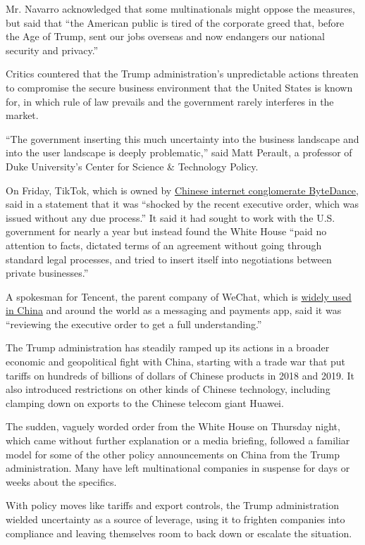 Mr. Navarro acknowledged that some multinationals might oppose the
measures, but said that ``the American public is tired of the corporate
greed that, before the Age of Trump, sent our jobs overseas and now
endangers our national security and privacy.''

Critics countered that the Trump administration's unpredictable actions
threaten to compromise the secure business environment that the United
States is known for, in which rule of law prevails and the government
rarely interferes in the market.

``The government inserting this much uncertainty into the business
landscape and into the user landscape is deeply problematic,'' said Matt
Perault, a professor of Duke University's Center for Science \&
Technology Policy.

On Friday, TikTok, which is owned by
\href{https://www.nytimes.com/2018/10/29/technology/bytedance-app-funding-china.html}{Chinese
internet conglomerate ByteDance}, said in a statement that it was
``shocked by the recent executive order, which was issued without any
due process.'' It said it had sought to work with the U.S. government
for nearly a year but instead found the White House ``paid no attention
to facts, dictated terms of an agreement without going through standard
legal processes, and tried to insert itself into negotiations between
private businesses.''

A spokesman for Tencent, the parent company of WeChat, which is
\href{https://www.nytimes.com/video/technology/100000004574648/china-internet-wechat.html}{widely
used in China} and around the world as a messaging and payments app,
said it was ``reviewing the executive order to get a full
understanding.''

The Trump administration has steadily ramped up its actions in a broader
economic and geopolitical fight with China, starting with a trade war
that put tariffs on hundreds of billions of dollars of Chinese products
in 2018 and 2019. It also introduced restrictions on other kinds of
Chinese technology, including clamping down on exports to the Chinese
telecom giant Huawei.

The sudden, vaguely worded order from the White House on Thursday night,
which came without further explanation or a media briefing, followed a
familiar model for some of the other policy announcements on China from
the Trump administration. Many have left multinational companies in
suspense for days or weeks about the specifics.

With policy moves like tariffs and export controls, the Trump
administration wielded uncertainty as a source of leverage, using it to
frighten companies into compliance and leaving themselves room to back
down or escalate the situation.

